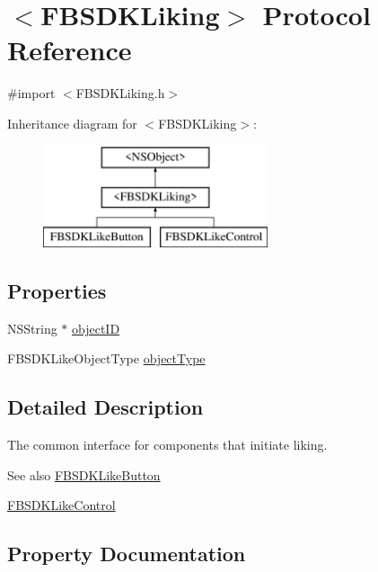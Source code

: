\hypertarget{protocol_f_b_s_d_k_liking-p}{}\section{$<$F\+B\+S\+D\+K\+Liking$>$ Protocol Reference}
\label{protocol_f_b_s_d_k_liking-p}


{\ttfamily \#import $<$F\+B\+S\+D\+K\+Liking.\+h$>$}

Inheritance diagram for $<$F\+B\+S\+D\+K\+Liking$>$\+:\begin{figure}[H]
\begin{center}
\leavevmode
\includegraphics[height=3.000000cm]{protocol_f_b_s_d_k_liking-p}
\end{center}
\end{figure}
\subsection*{Properties}
\begin{DoxyCompactItemize}
\item 
N\+S\+String $\ast$ \hyperlink{protocol_f_b_s_d_k_liking-p_ae1fb9b5b4792c73a336120f8101574b5}{object\+I\+D}
\item 
F\+B\+S\+D\+K\+Like\+Object\+Type \hyperlink{protocol_f_b_s_d_k_liking-p_a7e888287a80f5cc50af1d423e37f3cda}{object\+Type}
\end{DoxyCompactItemize}


\subsection{Detailed Description}
The common interface for components that initiate liking. \begin{DoxySeeAlso}{See also}
\hyperlink{interface_f_b_s_d_k_like_button}{F\+B\+S\+D\+K\+Like\+Button} 

\hyperlink{interface_f_b_s_d_k_like_control}{F\+B\+S\+D\+K\+Like\+Control} 
\end{DoxySeeAlso}


\subsection{Property Documentation}
\hypertarget{protocol_f_b_s_d_k_liking-p_ae1fb9b5b4792c73a336120f8101574b5}{}
